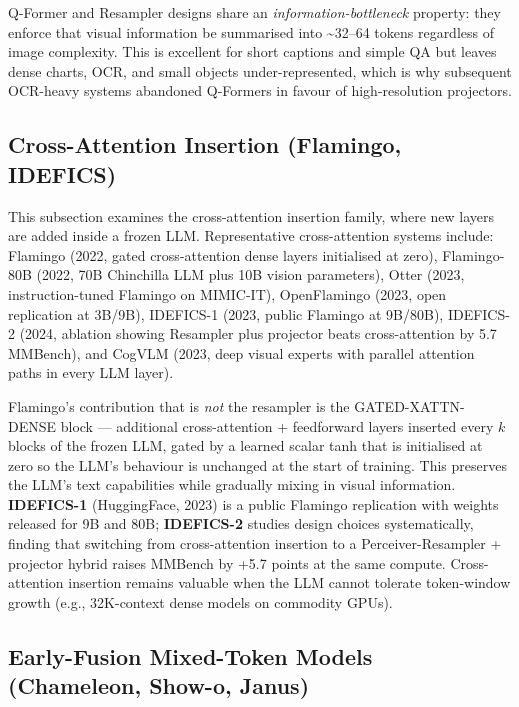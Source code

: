 \documentclass{article}
\begin{document}
Q-Former and Resampler designs share an \emph{information-bottleneck} property: they enforce that visual information be summarised into \textasciitilde32--64 tokens regardless of image complexity. This is excellent for short captions and simple QA but leaves dense charts, OCR, and small objects under-represented, which is why subsequent OCR-heavy systems abandoned Q-Formers in favour of high-resolution projectors.

\subsection{Cross-Attention Insertion (Flamingo, IDEFICS)}\label{cross-attention-insertion-flamingo-idefics}

This subsection examines the cross-attention insertion family, where new layers are added inside a frozen LLM. Representative cross-attention systems include: Flamingo (2022, gated cross-attention dense layers initialised at zero), Flamingo-80B (2022, 70B Chinchilla LLM plus 10B vision parameters), Otter (2023, instruction-tuned Flamingo on MIMIC-IT), OpenFlamingo (2023, open replication at 3B/9B), IDEFICS-1 (2023, public Flamingo at 9B/80B), IDEFICS-2 (2024, ablation showing Resampler plus projector beats cross-attention by 5.7 MMBench), and CogVLM (2023, deep visual experts with parallel attention paths in every LLM layer).

Flamingo's contribution that is \emph{not} the resampler is the GATED-XATTN-DENSE block --- additional cross-attention + feedforward layers inserted every \(k\) blocks of the frozen LLM, gated by a learned scalar tanh that is initialised at zero so the LLM's behaviour is unchanged at the start of training. This preserves the LLM's text capabilities while gradually mixing in visual information. \textbf{IDEFICS-1} (HuggingFace, 2023) is a public Flamingo replication with weights released for 9B and 80B; \textbf{IDEFICS-2} \citep{laurenon2024whatmatterswhenbui} studies design choices systematically, finding that switching from cross-attention insertion to a Perceiver-Resampler + projector hybrid raises MMBench by +5.7 points at the same compute. Cross-attention insertion remains valuable when the LLM cannot tolerate token-window growth (e.g., 32K-context dense models on commodity GPUs).

\subsection{Early-Fusion Mixed-Token Models (Chameleon, Show-o, Janus)}\label{early-fusion-mixed-token-models-chameleon-show-o-janus}
\end{document}

